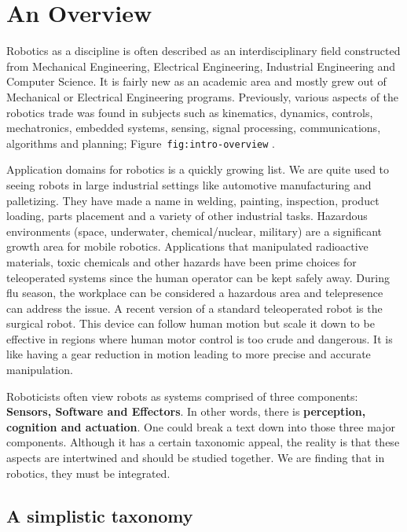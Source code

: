 \hypertarget{an-overview}{%
\section{An Overview}\label{an-overview}}

Robotics as a discipline is often described as an interdisciplinary
field constructed from Mechanical Engineering, Electrical Engineering,
Industrial Engineering and Computer Science. It is fairly new as an
academic area and mostly grew out of Mechanical or Electrical
Engineering programs. Previously, various aspects of the robotics trade
was found in subjects such as kinematics, dynamics, controls,
mechatronics, embedded systems, sensing, signal processing,
communications, algorithms and planning;
Figure~\texttt{fig:intro-overview} .

Application domains for robotics is a quickly growing list. We are quite
used to seeing robots in large industrial settings like automotive
manufacturing and palletizing. They have made a name in welding,
painting, inspection, product loading, parts placement and a variety of
other industrial tasks. Hazardous environments (space, underwater,
chemical/nuclear, military) are a significant growth area for mobile
robotics. Applications that manipulated radioactive materials, toxic
chemicals and other hazards have been prime choices for teleoperated
systems since the human operator can be kept safely away. During flu
season, the workplace can be considered a hazardous area and
telepresence can address the issue. A recent version of a standard
teleoperated robot is the surgical robot. This device can follow human
motion but scale it down to be effective in regions where human motor
control is too crude and dangerous. It is like having a gear reduction
in motion leading to more precise and accurate manipulation.

Roboticists often view robots as systems comprised of three components:
\textbf{Sensors, Software and Effectors}. In other words, there is
\textbf{perception, cognition and actuation}. One could break a text
down into those three major components. Although it has a certain
taxonomic appeal, the reality is that these aspects are intertwined and
should be studied together. We are finding that in robotics, they must
be integrated.

\hypertarget{a-simplistic-taxonomy}{%
\subsection{A simplistic taxonomy}\label{a-simplistic-taxonomy}}

